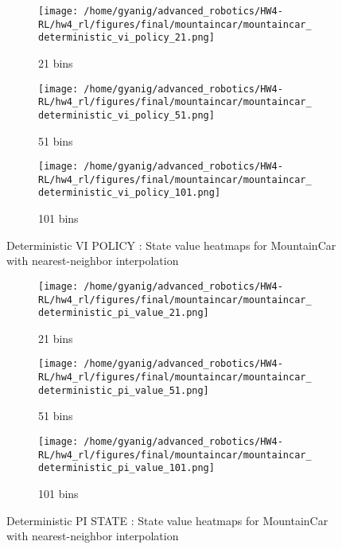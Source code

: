 \documentclass{article}
\begin{document}
\begin{figure}[h]
    \centering
    \begin{subfigure}{0.32\textwidth}
        \texttt{[image: /home/gyanig/advanced\_robotics/HW4-RL/hw4\_rl/figures/final/mountaincar/mountaincar\_deterministic\_vi\_policy\_21.png]}
        \caption{21 bins}
    \end{subfigure}
    \begin{subfigure}{0.32\textwidth}
        \texttt{[image: /home/gyanig/advanced\_robotics/HW4-RL/hw4\_rl/figures/final/mountaincar/mountaincar\_deterministic\_vi\_policy\_51.png]}
        \caption{51 bins}
    \end{subfigure}
    \begin{subfigure}{0.32\textwidth}
        \texttt{[image: /home/gyanig/advanced\_robotics/HW4-RL/hw4\_rl/figures/final/mountaincar/mountaincar\_deterministic\_vi\_policy\_101.png]}
        \caption{101 bins}
    \end{subfigure}
    \caption{Deterministic VI POLICY : State value heatmaps for MountainCar with nearest-neighbor interpolation}
\end{figure}
\newpage
\begin{figure}[h]
    \centering
    \begin{subfigure}{0.32\textwidth}
        \texttt{[image: /home/gyanig/advanced\_robotics/HW4-RL/hw4\_rl/figures/final/mountaincar/mountaincar\_deterministic\_pi\_value\_21.png]}
        \caption{21 bins}
    \end{subfigure}
    \begin{subfigure}{0.32\textwidth}
        \texttt{[image: /home/gyanig/advanced\_robotics/HW4-RL/hw4\_rl/figures/final/mountaincar/mountaincar\_deterministic\_pi\_value\_51.png]}
        \caption{51 bins}
    \end{subfigure}
    \begin{subfigure}{0.32\textwidth}
        \texttt{[image: /home/gyanig/advanced\_robotics/HW4-RL/hw4\_rl/figures/final/mountaincar/mountaincar\_deterministic\_pi\_value\_101.png]}
        \caption{101 bins}
    \end{subfigure}
    \caption{Deterministic PI STATE : State value heatmaps for MountainCar with nearest-neighbor interpolation}
\end{figure}
\end{document}
